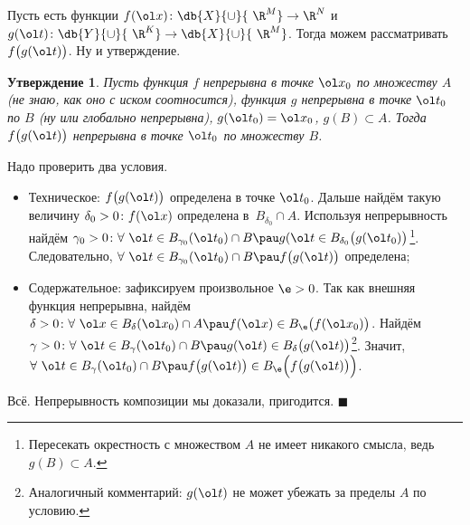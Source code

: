 \documentclass[a4paper,10pt,twoside]{article}
\newtheorem{Ut}{Утверждение}[section]
\newenvironment{Proof}
       {\par\noindent{\textbf{Доказательство.}}}
       {\hfill$\scriptstyle\blacksquare$}
\begin{document}
	 Пусть есть функции $f(\ol x)\colon \db{X}{\cup}{ \ \R^M}\to\R^N$ и $g(\ol t)\colon \db{Y}{\cup}{ \ \R^K}\to \db{X}{\cup}{ \ \R^M}$. Тогда можем рассматривать $f\big(g(\ol t)\big)$. Ну и утверждение.
	 \begin{Ut}
	 Пусть функция $f$ непрерывна в точке $\ol x_0$ по множеству $A$ (не знаю, как оно с иском соотносится), функция $g$ непрерывна в точке $\ol t_0$
	 по $B$ (ну или глобально непрерывна), $g(\ol t_0) = \ol x_0$, $g(B)\subset A$. 
	 Тогда $f\big(g(\ol t)\big)$ непрерывна в точке $\ol t_0$ по множеству $B$.
	 \end{Ut}
	 \begin{Proof}
	 Надо проверить два условия.
	 \begin{itemize}
	   \item Техническое: $f\big(g(\ol t)\big)$ определена в точке $\ol t_0$. Дальше найдём такую величину $\delta_0 >0\colon f(\ol x)$ определена
	   в~$B_{\delta_0}\cap A$. Используя непрерывность найдём $\gamma_0>0\colon \forall\ \ol t\in B_{\gamma_0}(\ol t_0)\cap B\pau g(\ol t\in B_{\delta_0}\big(g(\ol t_0)\big)$\footnote{Пересекать окрестность с множеством $A$ не имеет никакого смысла, ведь $g(B)\subset A$.}.
	   Следовательно, $\forall\ \ol t\in B_{\gamma_0}(\ol t_0)\cap B\pau f\big(g(\ol t)\big)$ определена;
	   \item Содержательное: зафиксируем произвольное $\e>0$. Так как внешняя функция непрерывна, найдём $\delta > 0\colon \forall\ \ol x\in B_\delta(\ol x_0)\cap A\pau
	   f(\ol x)\in B_{\e}\big(f(\ol x_0)\big)$. Найдём $\gamma>0\colon \forall\ \ol t\in B_\gamma(\ol t_0)\cap B\pau g(\ol t)\in B_\delta\big(g(\ol t)\big)$\footnote{Аналогичный комментарий: $g(\ol t)$ не может убежать за пределы $A$ по условию.}.
	   Значит, $\forall\ \ol t\in B_\gamma(\ol t_0)\cap B\pau f\big(g(\ol t)\big)\in B_\e\Big(f\big(g(\ol t)\big)\Big)$.
	 \end{itemize}
	 Всё. Непрерывность композиции мы доказали, пригодится.
	 \end{Proof}
	 
\end{document}
